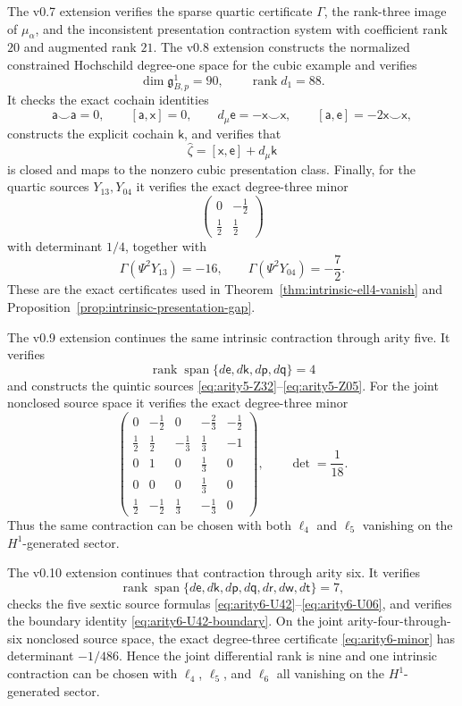 \documentclass[11pt]{amsart}
\newcommand{\Span}{\operatorname{span}}
\newcommand{\rank}{\operatorname{rank}}
\newcommand{\ghoch}{\mathfrak g}
\begin{document}
The v0.7 extension verifies the sparse quartic certificate $\Gamma$, the rank-three image of $\mu_\alpha$, and the inconsistent presentation contraction system with coefficient rank $20$ and augmented rank $21$.  The v0.8 extension constructs the normalized constrained Hochschild degree-one space for the cubic example and verifies
\[
\dim\ghoch^1_{B,p}=90,
\qquad
\rank d_1=88.
\]
It checks the exact cochain identities
\[
\mathsf a\smile\mathsf a=0,
\qquad
[\mathsf a,\mathsf x]=0,
\qquad
 d_\mu\mathsf e=-\mathsf x\smile\mathsf x,
\qquad
[\mathsf a,\mathsf e]=-2\mathsf x\smile\mathsf x,
\]
constructs the explicit cochain $\mathsf k$, and verifies that
\[
\widehat\zeta=[\mathsf x,\mathsf e]+d_\mu\mathsf k
\]
is closed and maps to the nonzero cubic presentation class.  Finally, for the quartic sources $Y_{13},Y_{04}$ it verifies the exact degree-three minor
\[
\begin{pmatrix}
0&-\tfrac12\\
\tfrac12&\tfrac12
\end{pmatrix}
\]
with determinant $1/4$, together with
\[
\Gamma(\Psi^2Y_{13})=-16,
\qquad
\Gamma(\Psi^2Y_{04})=-\frac72.
\]
These are the exact certificates used in Theorem~\ref{thm:intrinsic-ell4-vanish} and Proposition~\ref{prop:intrinsic-presentation-gap}.

The v0.9 extension continues the same intrinsic contraction through arity five.  It verifies
\[
\rank\Span\{d\mathsf e,d\mathsf k,d\mathsf p,d\mathsf q\}=4
\]
and constructs the quintic sources \eqref{eq:arity5-Z32}--\eqref{eq:arity5-Z05}.  For the joint nonclosed source space it verifies the exact degree-three minor
\[
\begin{pmatrix}
0&-\tfrac12&0&-\tfrac23&-\tfrac12\\
\tfrac12&\tfrac12&-\tfrac13&\tfrac13&-1\\
0&1&0&\tfrac13&0\\
0&0&0&\tfrac13&0\\
\tfrac12&-\tfrac12&\tfrac13&-\tfrac13&0
\end{pmatrix},
\qquad
\det=\frac1{18}.
\]
Thus the same contraction can be chosen with both $\ell_4$ and $\ell_5$ vanishing on the $H^1$-generated sector.

The v0.10 extension continues that contraction through arity six.  It verifies
\[
\rank\Span\{d\mathsf e,d\mathsf k,d\mathsf p,d\mathsf q,d\mathsf r,d\mathsf w,d\mathsf t\}=7,
\]
checks the five sextic source formulas \eqref{eq:arity6-U42}--\eqref{eq:arity6-U06}, and verifies the boundary identity \eqref{eq:arity6-U42-boundary}.  On the joint arity-four-through-six nonclosed source space, the exact degree-three certificate \eqref{eq:arity6-minor} has determinant $-1/486$.  Hence the joint differential rank is nine and one intrinsic contraction can be chosen with $\ell_4$, $\ell_5$, and $\ell_6$ all vanishing on the $H^1$-generated sector.
\end{document}
